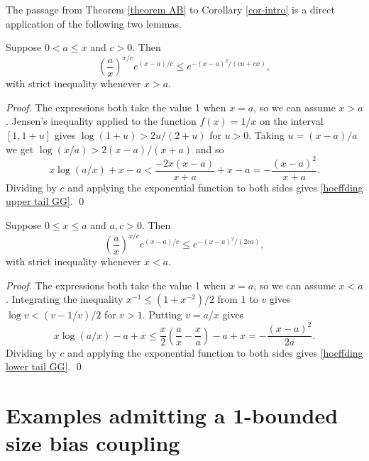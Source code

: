 \documentclass[smallextended,envcountsect]{svjour3}
\begin{document}
\vspace{2ex}

The passage from Theorem \ref{theorem AB} to Corollary \ref{cor-intro} is a direct application of the following two lemmas.

\begin{lemma} \label{lemma hoeffding upper} Suppose $0 < a \le x$ and $c >0$.  Then
     \begin{equation} \label{hoeffding upper tail GG}
    \left(\frac{a}{x}\right)^{x/c} e^{(x-a)/c} \le e^{-(x-a)^2/(ca+cx)},
    \end{equation}
with strict inequality whenever $x > a$.   \end{lemma}

\begin{proof} The expressions both take the value 1 when $x = a$, so we can assume $x > a$.  Jensen's inequality applied to the function $f(x) = 1/x$ on the interval $[1,1+u]$ gives $\log(1+ u) > 2u/(2+u)$ for $u > 0$.  Taking $u = (x-a)/a$ we get $\log(x/a) > 2(x-a)/(x+a)$ and so
   $$
   x \log(a/x) +x-a < \frac{-2x(x-a)}{x+a} + x-a = -\frac{(x-a)^2}{x+a}.
   $$
Dividing by $c$ and applying the exponential function to both sides gives \eqref{hoeffding upper tail GG}.
\qed \end{proof}

\begin{lemma}  \label{lemma hoeffding lower} Suppose $0 \le x \le a$ and $a,c >0$.  Then
     \begin{equation} \label{hoeffding lower tail GG}
    \left(\frac{a}{x}\right)^{x/c} e^{(x-a)/c} \le e^{-(x-a)^2/(2ca)},
    \end{equation}
with strict inequality whenever $x < a$.
    \end{lemma}

\begin{proof}  The expressions both take the value 1 when $x = a$, so we can assume $x < a$.  Integrating the inequality $x^{-1} \le (1+x^{-2})/2$ from $1$ to $v $ gives
$\log v < (v-1/v)/2$ for $v > 1$.  Putting $v=a/x$ gives
    $$
    x \log(a/x) -a+x \le \frac{x}{2}\left(\frac{a}{x}-\frac{x}{a}\right)-a+x = -\frac{(x-a)^2}{2a}.
    $$
Dividing by $c$ and applying the exponential function to both sides gives \eqref{hoeffding lower tail GG}.
\qed \end{proof}

\section{Examples admitting a 1-bounded size bias coupling} \label{sect examples}
\end{document}
